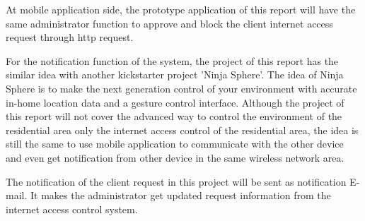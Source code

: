 \par At mobile application side, the prototype application of this report will have the same administrator function to approve and block the client internet access request through \gls{http} request.
\par For the notification function of the system, the project of this report has the similar idea with another kickstarter project 'Ninja Sphere'\cite{ninja_sphere}. The idea of Ninja Sphere is to make the next generation control of your environment with accurate in-home location data and a gesture control interface. Although the project of this report will not cover the advanced way to control the environment of the residential area only the internet access control of the residential area, the idea is still the same to use mobile application to communicate with the other device and even get notification from other device in the same wireless network area. 
\par The notification of the client request in this project will be sent as notification E-mail. It makes the administrator get updated request information from the internet access control system.


